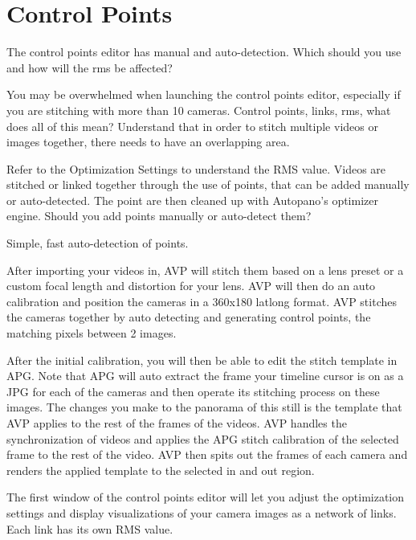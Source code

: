 \chapter{Control Points}
\pagecolor{white}
\label{chap:36}
\begin{fullwidth}


\problem

{\large The control points editor has manual and auto-detection. Which should you use and how will the rms be affected? \par}

You may be overwhelmed when launching the control points editor, especially if you are stitching with more than 10 cameras. Control points, links, rms, what does all of this mean? Understand that in order to stitch multiple videos or images together, there needs to have an overlapping area. 

Refer to the Optimization Settings to understand the RMS value. Videos are stitched or linked together through the use of points, that can be added manually or auto-detected. The point are then cleaned up with Autopano’s optimizer engine. Should you add points manually or auto-detect them?

\solutions

{\large Simple, fast auto-detection of points. \par}

After importing your videos in, AVP will stitch them based on a lens preset or a custom focal length and distortion for your lens. AVP will then do an auto calibration and position the cameras in a 360x180 latlong format. AVP stitches the cameras together by auto detecting and generating control points, the matching pixels between 2 images.

After the initial calibration, you will then be able to edit the stitch template in APG. Note that APG will auto extract the frame your timeline cursor is on as a JPG for each of the cameras and then operate its stitching process on these images. The changes you make to the panorama of this still is the template that AVP applies to the rest of the frames of the videos. AVP handles the synchronization of videos and applies the APG stitch calibration of the selected frame to the rest of the video. AVP then spits out the frames of each camera and renders the applied template to the selected in and out region. 

The first window of the control points editor will let you adjust the optimization settings and display visualizations of your camera images as a network of links. Each link has its own RMS value.


\end{fullwidth}
